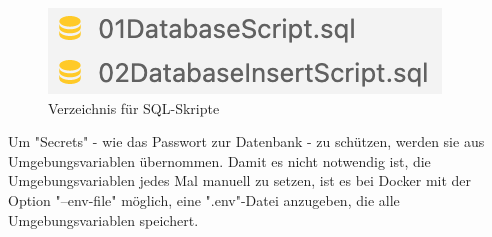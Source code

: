\begin{figure}
    \centering
    \includegraphics{media/Docker/SQLScriptDir.png}
    \caption{Verzeichnis für SQL-Skripte}
    \label{fig:SQLScriptDir}
\end{figure}

Um "Secrets" - wie das Passwort zur Datenbank - zu schützen, werden sie aus Umgebungsvariablen übernommen.
Damit es nicht notwendig ist, die Umgebungsvariablen jedes Mal manuell zu setzen, ist es bei Docker mit der Option "{\ttfamily --env-file}" möglich, eine ".env"-Datei anzugeben, die alle Umgebungsvariablen speichert. \label{par:dockerEnvFile} 

